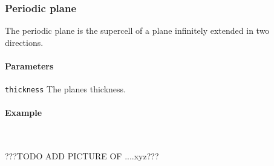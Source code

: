 \subsubsection{Periodic plane}
The periodic plane is the supercell of a plane infinitely extended in two directions.

\paragraph{Parameters}
\begin{description}
 \item{\lstinline{thickness}} The planes thickness.
\end{description}

\paragraph{Example}\ 


???TODO ADD PICTURE OF ....xyz???